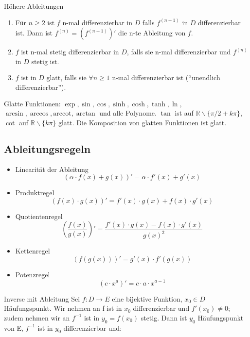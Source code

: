 \documentclass[a4paper,10pt]{article}
\def\R{\mathbb{R}}
\begin{document}
\begin{mainbox}{Höhere Ableitungen}
 \begin{enumerate}
  \item Für $n \ge 2$ ist $f$ n-mal differenzierbar in $D$ falls $f^{(n-1)}$ in $D$ differenzierbar ist. Dann ist $f^{(n)} = (f^{(n-1)})'$ die n-te Ableitung von $f$.
  \item $f$ ist n-mal stetig differenzierbar in $D$, falls sie n-mal differenzierbar und $f^{(n)}$ in $D$ stetig ist.
  \item $f$ ist in $D$ glatt, falls sie $\forall n \ge 1$ n-mal differenzierbar ist (``unendlich differenzierbar'').
 \end{enumerate}
\end{mainbox}
Glatte Funktionen: $\exp, \sin, \cos, \sinh, \cosh, \tanh, \ln,$\\ $ \arcsin, \arccos, \text{arccot}, \arctan$ und alle Polynome. $\tan$ ist auf $\R \backslash \{\pi/2 + k\pi\}$, $\cot$ auf $\R \backslash \{k\pi\}$ glatt. Die Komposition von glatten Funktionen ist glatt.

\subsection{Ableitungsregeln}

\begin{itemize}
  \item Linearität der Ableitung
  $$(\alpha \cdot f(x) + g(x))' = \alpha \cdot f'(x) + g'(x)$$
  \item Produktregel
  $$(f(x) \cdot g(x))' = f'(x) \cdot g(x) + f(x) \cdot g'(x)$$
  \item Quotientenregel
  $$\left(\frac{f(x)}{g(x)}\right)' = \frac{f'(x) \cdot g(x) - f(x) \cdot g'(x)}{g(x)^2}$$
  \item Kettenregel
  $$(f(g(x)))' = g'(x) \cdot f'(g(x))$$
  \item Potenzregel
  $$(c \cdot x^a)' = c \cdot a \cdot x^{a - 1}$$
\end{itemize}

\begin{subbox}{Inverse mit Ableitung}
  Sei $f: D\to E$ eine bijektive Funktion, $x_0 \in D$ Häufungspunkt. Wir nehmen an f ist in $x_0$ differenzierbar und $f'(x_0) \neq 0$; zudem nehmen wir an $f^{-1}$ ist in $y_0 = f(x_0)$ stetig. Dann ist $y_0$ Häufungspunkt von E, $f^{-1}$ ist in $y_0$ differenzierbar und:\\ 
\end{subbox}
\end{document}
